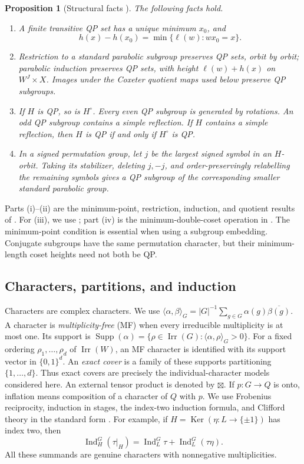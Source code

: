 \documentclass[11pt]{article}
\numberwithin{equation}{section}
\newtheorem{proposition}[theorem]{Proposition}
\theoremstyle{definition}
\DeclareMathOperator{\Ind}{Ind}
\DeclareMathOperator{\Irr}{Irr}
\DeclareMathOperator{\Supp}{Supp}
\DeclareMathOperator{\Ker}{Ker}
\begin{document}
\begin{proposition}[Structural facts \cite{RV,Lu}]
\label{prop:QPfacts}
The following facts hold.
\begin{enumerate}[label=(\roman*)]
\item A finite transitive QP set has a unique minimum \(x_0\), and
\[
 h(x)-h(x_0)=\min\{\ell(w):wx_0=x\}.
\]
\item Restriction to a standard parabolic subgroup preserves QP sets, orbit by orbit; parabolic induction preserves QP sets, with height \(\ell(w)+h(x)\) on \(W^J\times X\).
Images under the Coxeter quotient maps used below preserve QP subgroups.
\item If \(H\) is QP, so is \(H^\circ\). Every even QP subgroup is generated by rotations.
An odd QP subgroup contains a simple reflection.
If \(H\) contains a simple reflection, then \(H\) is QP if and only if \(H^\circ\) is QP.
\item In a signed permutation group, let \(j\) be the largest signed symbol in an \(H\)-orbit.
Taking its stabilizer, deleting \(j,-j\), and order-preservingly relabelling the remaining symbols gives a QP subgroup of the corresponding smaller standard parabolic group.
\end{enumerate}
\end{proposition}

Parts (i)--(ii) are the minimum-point, restriction, induction, and quotient results of \cite{RV}.
For (iii), we use \cite[Theorems 1--2 and Chapter 2]{Lu}; part (iv) is the minimum-double-coset operation in \cite[Example 8]{Lu}.
The minimum-point condition is essential when using a subgroup embedding.
Conjugate subgroups have the same permutation character, but their minimum-length coset heights need not both be QP.

\subsection{Characters, partitions, and induction}

Characters are complex characters.
We use
\(\langle\alpha,\beta\rangle_G=|G|^{-1}\sum_{g\in G}\alpha(g)\overline{\beta(g)}\).
A character is \emph{multiplicity-free} (MF) when every irreducible multiplicity is at most one.
Its support is
\(\Supp(\alpha)=\{\rho\in\Irr(G):\langle\alpha,\rho\rangle_G>0\}\).
For a fixed ordering \(\rho_1,\ldots,\rho_d\) of \(\Irr(W)\), an MF character is identified with its support vector in \(\{0,1\}^d\).
An \emph{exact cover} is a family of these supports partitioning \(\{1,\ldots,d\}\).
Thus exact covers are precisely the individual-character models considered here.
An external tensor product is denoted by \(\boxtimes\).
If \(p:G\to Q\) is onto, inflation means composition of a character of \(Q\) with \(p\).
We use Frobenius reciprocity, induction in stages, the index-two induction formula, and Clifford theory in the standard form \cite{Serre,GeckPfeiffer}.
For example, if \(H=\Ker(\eta:L\to\{\pm1\})\) has index two, then
\[
 \Ind_H^G(\tau|_H)=\Ind_L^G\tau+\Ind_L^G(\tau\eta).
\]
All these summands are genuine characters with nonnegative multiplicities.
\end{document}
